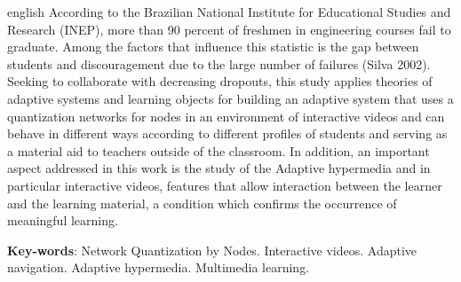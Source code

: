 \begin{resumo}[Abstract]
 \begin{otherlanguage*}{english}
According to the Brazilian National Institute for Educational Studies and Research (INEP), more than 90 percent of freshmen in engineering courses fail to graduate. Among the factors that influence this statistic is the gap between students and discouragement due to the large number of failures (Silva 2002). Seeking to collaborate with decreasing dropouts, this study applies theories of adaptive systems and learning objects for building an adaptive system that uses a quantization networks for nodes in an environment of interactive videos and can behave in different ways according to different profiles of students and serving as a material aid to teachers outside of the classroom. In addition, an important aspect addressed in this work is the study of the Adaptive hypermedia and in particular interactive videos, features that allow interaction between the learner and the learning material, a condition which confirms the occurrence of meaningful learning.

   \vspace{\onelineskip}
 
   \noindent 
   \textbf{Key-words}: Network Quantization by Nodes. Interactive videos. Adaptive navigation. Adaptive hypermedia. Multimedia learning.
 \end{otherlanguage*}
\end{resumo}
